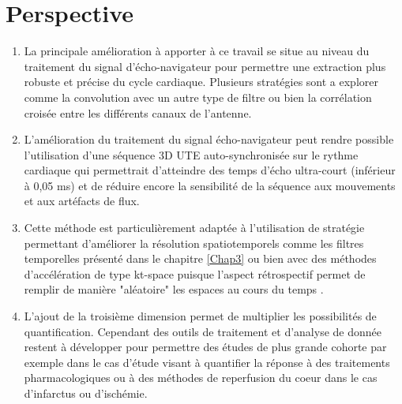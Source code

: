 \section{Perspective}
\begin{enumerate}

\item La principale amélioration à apporter à ce travail se situe au niveau du traitement du signal d'écho-navigateur pour permettre une extraction plus robuste et précise du cycle cardiaque. Plusieurs stratégies sont a explorer comme la convolution avec un autre type de filtre ou bien la corrélation croisée entre les différents canaux de l'antenne.

\item L'amélioration du traitement du signal écho-navigateur peut rendre possible l'utilisation d'une séquence 3D UTE auto-synchronisée sur le rythme cardiaque qui permettrait d'atteindre des temps d'écho ultra-court (inférieur à 0,05 ms) et de réduire encore la sensibilité de la séquence aux mouvements et aux artéfacts de flux.

\item Cette méthode est particulièrement adaptée à l'utilisation de stratégie permettant d'améliorer la résolution spatiotemporels comme les filtres temporelles présenté dans le chapitre \ref{Chap3} ou bien avec des méthodes d'accélération de type kt-space puisque l'aspect rétrospectif permet de remplir de manière "aléatoire" les espaces au cours du temps \cite{Motaal:2015aa}.

\item L'ajout de la troisième dimension permet de multiplier les possibilités de quantification. Cependant des outils de traitement et d'analyse de donnée restent à développer pour permettre des études de plus grande cohorte par exemple dans le cas d'étude visant à quantifier la réponse à des traitements pharmacologiques ou à des méthodes de reperfusion du coeur dans le cas d'infarctus ou d'ischémie.
\end{enumerate}



